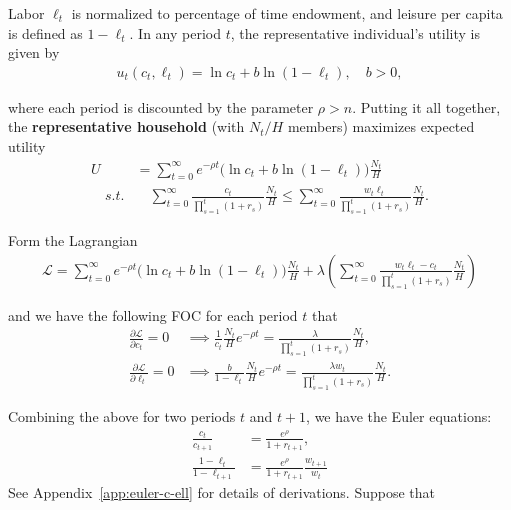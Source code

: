 \documentclass{article}
\renewcommand{\L}{\mathcal{L}}
\begin{document}
        Labor $\ell_t$ is normalized to percentage of time endowment, and leisure per capita is defined as $1-\ell_t$. In any period $t$, the representative individual's utility is given by
        \begin{align}
            u_t(c_t, \ell_t) = \ln c_t + b \ln(1-\ell_t),
            \quad b > 0,
        \end{align}
        
        where each period is discounted by the parameter $\rho > n$. Putting it all together, the \textbf{representative household} (with $N_t/H$ members) maximizes expected utility
        \begin{align}
            U &= \sum_{t=0}^\infty e^{-\rho t}
            \bigg( \ln c_t + b \ln(1-\ell_t) \bigg)
            \frac{N_t}{H}
            \\
            \quad s.t. &\quad
            \sum_{t=0}^{\infty}
            \frac{c_t}{\prod_{s=1}^{t}(1+r_s)} \frac{N_t}{H}\le
            \sum_{t=0}^{\infty}
            \frac{w_t \ell_t}{\prod_{s=1}^{t}(1+r_s)} \frac{N_t}{H}.
        \end{align}
        
        Form the Lagrangian
        \begin{align}
            \L
            = \sum_{t=0}^\infty e^{-\rho t}
            \bigg( \ln c_t + b \ln(1-\ell_t) \bigg)
            \frac{N_t}{H} 
            + \lambda \left(
                \sum_{t=0}^{\infty}
                \frac{w_t \ell_t - c_t}{\prod_{s=1}^{t}(1+r_s)}\frac{N_t}{H}
                \right)
        \end{align}
        
        and we have the following FOC for each period $t$ that
        \begin{align}
            \frac{\partial \L}{\partial c_t} = 0
            &\implies
            \frac{1}{c_t}\frac{N_t}{H}e^{-\rho t}
            = \frac{\lambda}{\prod_{s=1}^{t}(1+r_s)} \frac{N_t}{H}, 
            \label{eqn:foc-1}
            \\
            \frac{\partial \L}{\partial \ell_t} = 0
            &\implies
            \frac{b}{1 - \ell_t}\frac{N_t}{H}e^{-\rho t}
            = \frac{\lambda w_t}{\prod_{s=1}^{t}(1+r_s)}\frac{N_t}{H}.
            \label{eqn:foc-2}
        \end{align}
        
        
        Combining the above for two periods $t$ and $t+1$, we have the Euler equations:
        \begin{align}
            \frac{c_t}{c_{t+1}}
            &= \frac{e^{\rho}}{1+r_{t+1}},
            \label{eqn:euler-c}
            \\
            \frac{1-\ell_t}{1-\ell_{t+1}}
            &= \frac{e^{\rho}}{1+r_{t+1}}\frac{w_{t+1}}{w_t}
            \label{eqn:euler-ell}
        \end{align}
        See Appendix~\ref{app:euler-c-ell} for details of derivations. Suppose that
        
\end{document}
